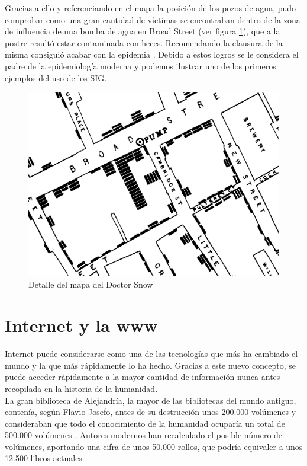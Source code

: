 Gracias a ello y referenciando en el mapa la posición de los pozos de agua, pudo comprobar como una gran cantidad de víctimas se encontraban dentro de la zona de influencia de una bomba de agua en Broad Street (ver figura \ref{fig:cholera_map_detail}), que a la postre resultó estar contaminada con heces. Recomendando la clausura de la misma consiguió acabar con la epidemia      \cite{Gunn07}. Debido a estos logros se le considera el padre de la epidemiología moderna y podemos ilustrar uno de los primeros ejemplos del uso de los \ac{SIG}.

\begin{figure}[h!btp]
\centering
\includegraphics[scale=0.5, fbox={\fboxrule} 4mm]{images/03-antecedentes/03-cholera_map_detail.png}
\caption{Detalle del mapa del Doctor Snow}
\label{fig:cholera_map_detail}
\end{figure}

\section{Internet y la \ac{www}}

Internet puede considerarse como una de las tecnologías que más ha cambiado el mundo y la que más rápidamente lo ha hecho. Gracias a este nuevo concepto, se puede acceder rápidamente a la mayor cantidad de información nunca antes recopilada en la historia de la humanidad.\\

La gran biblioteca de Alejandría, la mayor de las bibliotecas del mundo antiguo, contenía, según Flavio Josefo, antes de su destrucción unos 200.000 volúmenes y consideraban que todo el conocimiento de la humanidad ocuparía un total de 500.000 volúmenes  \cite{Jos94}. Autores modernos han recalculado el posible número de volúmenes, aportando una cifra de unos 50.000 rollos, que podría equivaler a unos 12.500 libros actuales \cite{Esco01}.\\

